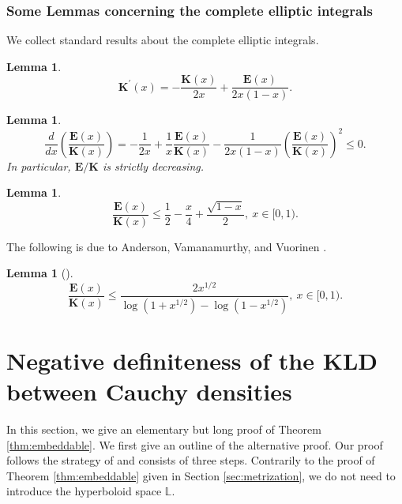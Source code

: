 \documentclass[journal]{IEEEtran}
\newtheorem{lemma}[theorem]{Lemma}
\begin{document}
\subsubsection{Some Lemmas concerning the complete elliptic integrals}

We collect standard results about the complete elliptic integrals. 

\begin{lemma}\label{K-deri}
\[ \mathbf{K}^{\prime}(x) = -\frac{\mathbf{K}(x)}{2x} + \frac{\mathbf{E}(x)}{2x(1-x)}. \]
\end{lemma}

\begin{lemma}\label{EK-deri}
\[ \frac{d}{dx}\left(\frac{\mathbf{E}(x)}{\mathbf{K}(x)} \right) = -\frac{1}{2x} + \frac{1}{x} \frac{\mathbf{E}(x)}{\mathbf{K}(x)} - \frac{1}{2x(1-x)} \left( \frac{\mathbf{E}(x)}{\mathbf{K}(x)}\right)^2 \le 0. \]
In particular, 
$\mathbf{E}/\mathbf{K}$ is strictly decreasing. 
\end{lemma}

\begin{lemma}\label{Gauss-AGM}
\[ \frac{\mathbf{E}(x)}{\mathbf{K}(x)} \le \frac{1}{2} - \frac{x}{4} + \frac{\sqrt{1-x}}{2}, \ x \in [0,1).\]
\end{lemma}

The following is due to Anderson,  Vamanamurthy, and Vuorinen \cite{AVV}. 

\begin{lemma}[{\cite[Theorem 3.6]{AVV}}]\label{AVV}
\[  \frac{\mathbf{E}(x)}{\mathbf{K}(x)} \le \frac{2 x^{1/2}}{\log(1+x^{1/2}) - \log(1-x^{1/2})}, \ x \in [0,1). \]
\end{lemma}

\section{Negative definiteness of the KLD between Cauchy densities}\label{sec:FH}

In this section, we give an elementary but long proof of Theorem \ref{thm:embeddable}. 
We first give an outline of the alternative proof. 
Our proof follows the strategy of \cite{Faraut-1972} and consists of three steps. 
Contrarily to the proof of  Theorem \ref{thm:embeddable} given in Section \ref{sec:metrization},  
we do not need to introduce the hyperboloid space $\mathbb L$. 
\end{document}
